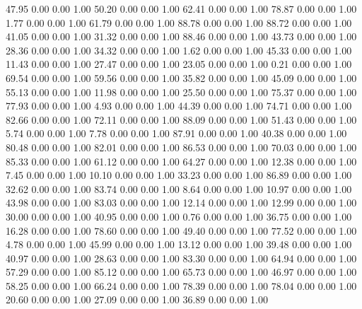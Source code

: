    47.95   0.00   0.00   1.00
   50.20   0.00   0.00   1.00
   62.41   0.00   0.00   1.00
   78.87   0.00   0.00   1.00
    1.77   0.00   0.00   1.00
   61.79   0.00   0.00   1.00
   88.78   0.00   0.00   1.00
   88.72   0.00   0.00   1.00
   41.05   0.00   0.00   1.00
   31.32   0.00   0.00   1.00
   88.46   0.00   0.00   1.00
   43.73   0.00   0.00   1.00
   28.36   0.00   0.00   1.00
   34.32   0.00   0.00   1.00
    1.62   0.00   0.00   1.00
   45.33   0.00   0.00   1.00
   11.43   0.00   0.00   1.00
   27.47   0.00   0.00   1.00
   23.05   0.00   0.00   1.00
    0.21   0.00   0.00   1.00
   69.54   0.00   0.00   1.00
   59.56   0.00   0.00   1.00
   35.82   0.00   0.00   1.00
   45.09   0.00   0.00   1.00
   55.13   0.00   0.00   1.00
   11.98   0.00   0.00   1.00
   25.50   0.00   0.00   1.00
   75.37   0.00   0.00   1.00
   77.93   0.00   0.00   1.00
    4.93   0.00   0.00   1.00
   44.39   0.00   0.00   1.00
   74.71   0.00   0.00   1.00
   82.66   0.00   0.00   1.00
   72.11   0.00   0.00   1.00
   88.09   0.00   0.00   1.00
   51.43   0.00   0.00   1.00
    5.74   0.00   0.00   1.00
    7.78   0.00   0.00   1.00
   87.91   0.00   0.00   1.00
   40.38   0.00   0.00   1.00
   80.48   0.00   0.00   1.00
   82.01   0.00   0.00   1.00
   86.53   0.00   0.00   1.00
   70.03   0.00   0.00   1.00
   85.33   0.00   0.00   1.00
   61.12   0.00   0.00   1.00
   64.27   0.00   0.00   1.00
   12.38   0.00   0.00   1.00
    7.45   0.00   0.00   1.00
   10.10   0.00   0.00   1.00
   33.23   0.00   0.00   1.00
   86.89   0.00   0.00   1.00
   32.62   0.00   0.00   1.00
   83.74   0.00   0.00   1.00
    8.64   0.00   0.00   1.00
   10.97   0.00   0.00   1.00
   43.98   0.00   0.00   1.00
   83.03   0.00   0.00   1.00
   12.14   0.00   0.00   1.00
   12.99   0.00   0.00   1.00
   30.00   0.00   0.00   1.00
   40.95   0.00   0.00   1.00
    0.76   0.00   0.00   1.00
   36.75   0.00   0.00   1.00
   16.28   0.00   0.00   1.00
   78.60   0.00   0.00   1.00
   49.40   0.00   0.00   1.00
   77.52   0.00   0.00   1.00
    4.78   0.00   0.00   1.00
   45.99   0.00   0.00   1.00
   13.12   0.00   0.00   1.00
   39.48   0.00   0.00   1.00
   40.97   0.00   0.00   1.00
   28.63   0.00   0.00   1.00
   83.30   0.00   0.00   1.00
   64.94   0.00   0.00   1.00
   57.29   0.00   0.00   1.00
   85.12   0.00   0.00   1.00
   65.73   0.00   0.00   1.00
   46.97   0.00   0.00   1.00
   58.25   0.00   0.00   1.00
   66.24   0.00   0.00   1.00
   78.39   0.00   0.00   1.00
   78.04   0.00   0.00   1.00
   20.60   0.00   0.00   1.00
   27.09   0.00   0.00   1.00
   36.89   0.00   0.00   1.00
